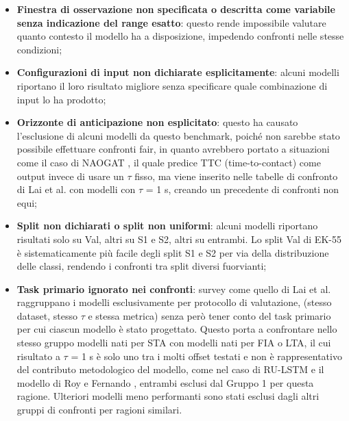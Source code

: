 \begin{itemize}
    \item \textbf{Finestra di osservazione non specificata o descritta come variabile senza indicazione del range esatto}: questo rende impossibile valutare quanto contesto il modello ha a disposizione, impedendo confronti nelle stesse condizioni;
    \item \textbf{Configurazioni di input non dichiarate esplicitamente}: alcuni modelli riportano il loro risultato migliore senza specificare quale combinazione di input lo ha prodotto;
    \item \textbf{Orizzonte di anticipazione non esplicitato}: questo ha causato l’esclusione di alcuni modelli da questo benchmark, poiché non sarebbe stato possibile effettuare confronti fair, in quanto avrebbero portato a situazioni come il caso di NAOGAT \cite{thakur2024leveraging}, il quale predice TTC (time-to-contact) come output invece di usare un $\tau$ fisso, ma viene inserito nelle tabelle di confronto di Lai et al. \cite{lai2024human} con modelli con $\tau$ = 1 s, creando un precedente di confronti non equi;
    \item \textbf{Split non dichiarati o split non uniformi}: alcuni modelli riportano risultati solo su Val, altri su S1 e S2, altri su entrambi. Lo split Val di EK-55 è sistematicamente più facile degli split S1 e S2 per via della distribuzione delle classi, rendendo i confronti tra split diversi fuorvianti;
    \item \textbf{Task primario ignorato nei confronti}: survey come quello di Lai et al. \cite{lai2024human} raggruppano i modelli esclusivamente per protocollo di valutazione, (stesso dataset, stesso $\tau$ e stessa metrica) senza però tener conto del task primario per cui ciascun modello è stato progettato. Questo porta a confrontare nello stesso gruppo modelli nati per STA con modelli nati per FIA o LTA, il cui risultato a $\tau$ = 1 s è solo uno tra i molti offset testati e non è rappresentativo del contributo metodologico del modello, come nel caso di RU-LSTM \cite{furnari2019would,furnari2020rolling} e il modello di Roy e Fernando \cite{roy2022action, roy2024predicting}, entrambi esclusi dal Gruppo 1 per questa ragione. Ulteriori modelli meno performanti sono stati esclusi dagli altri gruppi di confronti per ragioni similari.
\end{itemize}

